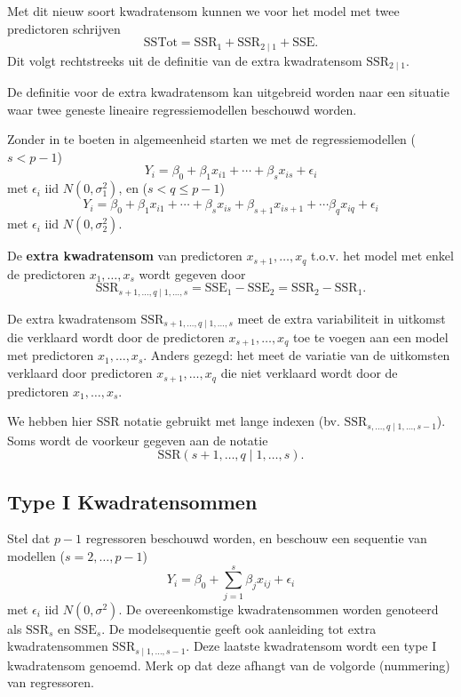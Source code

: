 \documentclass[12pt,dutch,coursenotes]{book}
\theoremstyle{definition}
\theoremstyle{definition}
\theoremstyle{definition}
\theoremstyle{remark}
\begin{document}
Met dit nieuw soort kwadratensom kunnen we voor het model met twee
predictoren schrijven \[
  \text{SSTot} = \text{SSR}_1+ \text{SSR}_{2\mid 1} + \text{SSE}.
\] Dit volgt rechtstreeks uit de definitie van de extra kwadratensom
\(\text{SSR}_{2\mid 1}\).

De definitie voor de extra kwadratensom kan uitgebreid worden naar een
situatie waar twee geneste lineaire regressiemodellen beschouwd worden.

Zonder in te boeten in algemeenheid starten we met de regressiemodellen
(\(s<p-1\)) \[
Y_i = \beta_0 + \beta_1 x_{i1} + \cdots + \beta_{s} x_{is} + \epsilon_i 
\] met \(\epsilon_i\text{ iid }N(0,\sigma_1^{2})\), en
(\(s< q\leq p-1\)) \[
Y_i = \beta_0 + \beta_1 x_{i1} + \cdots + \beta_{s} x_{is} + \beta_{s+1} x_{is+1} + \cdots \beta_{q}x_{iq}+ \epsilon_i 
\] met \(\epsilon_i\text{ iid } N(0,\sigma_2^{2})\).

De \textbf{extra kwadratensom} van predictoren \(x_{s+1}, \ldots, x_q\)
t.o.v. het model met enkel de predictoren \(x_1,\ldots, x_{s}\) wordt
gegeven door \[
  \text{SSR}_{s+1, \ldots, q\mid 1,\ldots, s} = \text{SSE}_1-\text{SSE}_2=\text{SSR}_2-\text{SSR}_1.
\]

De extra kwadratensom \(\text{SSR}_{s+1, \ldots, q\mid 1,\ldots, s}\)
meet de extra variabiliteit in uitkomst die verklaard wordt door de
predictoren \(x_{s+1}, \ldots, x_q\) toe te voegen aan een model met
predictoren \(x_1,\ldots, x_{s}\). Anders gezegd: het meet de variatie
van de uitkomsten verklaard door predictoren \(x_{s+1}, \ldots, x_q\)
die niet verklaard wordt door de predictoren \(x_1,\ldots, x_{s}\).

We hebben hier SSR notatie gebruikt met lange indexen (bv.
\(\text{SSR}_{s, \ldots, q\mid 1,\ldots, s-1}\)). Soms wordt de voorkeur
gegeven aan de notatie \[
  \text{SSR}(s+1, \ldots, q\mid 1,\ldots, s).
\]

\subsection{Type I Kwadratensommen}\label{type-i-kwadratensommen}

Stel dat \(p-1\) regressoren beschouwd worden, en beschouw een sequentie
van modellen (\(s=2,\ldots, p-1\)) \[
Y_i = \beta_0 + \sum_{j=1}^{s} \beta_j x_{ij} + \epsilon_i
\] met \(\epsilon_i\text{ iid } N(0,\sigma^{2})\). De overeenkomstige
kwadratensommen worden genoteerd als \(\text{SSR}_{s}\) en
\(\text{SSE}_{s}\). De modelsequentie geeft ook aanleiding tot extra
kwadratensommen \(\text{SSR}_{s\mid 1,\ldots, s-1}\). Deze laatste
kwadratensom wordt een type I kwadratensom genoemd. Merk op dat deze
afhangt van de volgorde (nummering) van regressoren.
\end{document}
